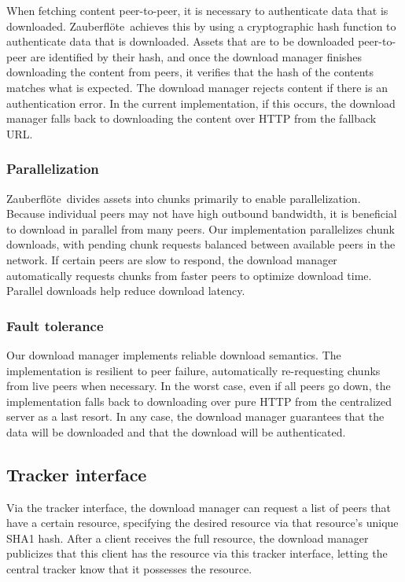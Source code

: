 \documentclass[letterpaper,twocolumn,10pt]{article}
\newcommand{\zbf}{Zauberfl\"{o}te}
\begin{document}
When fetching content peer-to-peer, it is necessary to authenticate data that
is downloaded. \zbf\ achieves this by using a cryptographic hash function to
authenticate data that is downloaded. Assets that are to be downloaded
peer-to-peer are identified by their hash, and once the download manager
finishes downloading the content from peers, it verifies that the hash of the
contents matches what is expected. The download manager rejects content if
there is an authentication error. In the current implementation, if this
occurs, the download manager falls back to downloading the content over HTTP
from the fallback URL.

\subsubsection{Parallelization}

\zbf\ divides assets into chunks primarily to enable parallelization. Because
individual peers may not have high outbound bandwidth, it is beneficial to
download in parallel from many peers. Our implementation parallelizes chunk
downloads, with pending chunk requests balanced between available peers in the
network. If certain peers are slow to respond, the download manager
automatically requests chunks from faster peers to optimize download time.
Parallel downloads help reduce download latency.

\subsubsection{Fault tolerance}

Our download manager implements reliable download semantics. The implementation
is resilient to peer failure, automatically re-requesting chunks from live
peers when necessary. In the worst case, even if all peers go down, the
implementation falls back to downloading over pure HTTP from the centralized
server as a last resort. In any case, the download manager guarantees that the
data will be downloaded and that the download will be authenticated.

\subsection{Tracker interface}

Via the tracker interface, the download manager can request a list of peers that 
have a certain resource, specifying the desired resource via that resource's 
unique SHA1 hash. After a client receives the full resource, the download 
manager publicizes that this client has the resource via this tracker interface,
letting the central tracker know that it possesses the resource.
\end{document}
